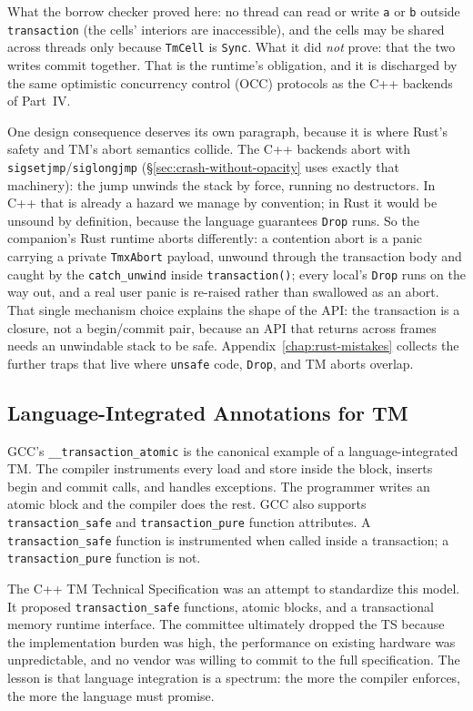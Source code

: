 What the borrow checker proved here: no thread can read or write
\texttt{a} or \texttt{b} outside \texttt{transaction} (the cells' interiors
are inaccessible), and the cells may be shared across threads only because
\texttt{TmCell} is \texttt{Sync}. What it did \emph{not} prove: that the
two writes commit together. That is the runtime's obligation, and it is
discharged by the same optimistic concurrency control (OCC) protocols as the
C++ backends of Part~IV.

One design consequence deserves its own paragraph, because it is where Rust's
safety and TM's abort semantics collide. The C++ backends abort with
\texttt{sigsetjmp}/\texttt{siglongjmp} (\S\ref{sec:crash-without-opacity}
uses exactly that machinery): the jump unwinds the stack by force, running
no destructors. In C++ that is already a hazard we manage by convention; in
Rust it would be unsound by definition, because the language guarantees
\texttt{Drop} runs. So the companion's Rust runtime aborts differently: a
contention abort is a panic carrying a private \texttt{TmxAbort} payload,
unwound through the transaction body and caught by the
\texttt{catch\_unwind} inside \texttt{transaction()}; every local's
\texttt{Drop} runs on the way out, and a real user panic is re-raised rather
than swallowed as an abort. That single mechanism choice explains the shape
of the API: the transaction is a closure, not a begin/commit pair, because
an API that returns across frames needs an unwindable stack to be safe.
Appendix~\ref{chap:rust-mistakes} collects the further traps that live where
\texttt{unsafe} code, \texttt{Drop}, and TM aborts overlap.

\subsection{Language-Integrated Annotations for TM}

GCC's \texttt{\_\_transaction\_atomic} is the canonical example of a
language-integrated TM. The compiler instruments every load and store inside
the block, inserts begin and commit calls, and handles exceptions. The
programmer writes an atomic block and the compiler does the rest. GCC also
supports \texttt{transaction\_\allowbreak safe} and \texttt{transaction\_\allowbreak pure} function
attributes. A \texttt{transaction\_\allowbreak safe} function is instrumented when called
inside a transaction; a \texttt{transaction\_\allowbreak pure} function is not.

The C++ TM Technical Specification was an attempt to standardize this model.
It proposed \texttt{transaction\_safe} functions, atomic blocks, and a
transactional memory runtime interface. The committee ultimately dropped the
TS because the implementation burden was high, the performance on existing
hardware was unpredictable, and no vendor was willing to commit to the full
specification. The lesson is that language integration is a spectrum: the more
the compiler enforces, the more the language must promise.

